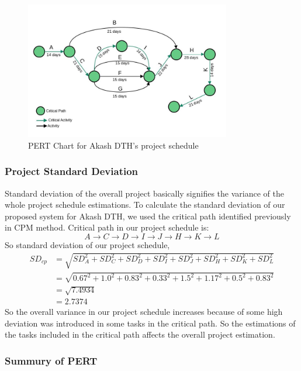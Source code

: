 \begin{spacing}{1}
\begin{figure}[H]
	\centering
	\includegraphics[width=0.8\textwidth]{PERT}
	\caption{PERT Chart for Akash DTH's project schedule}
	\label{fig:pert}
\end{figure} 
 
\subsubsection{Project Standard Deviation}
Standard deviation of the overall project basically signifies the variance of the whole project schedule estimations. To calculate the standard deviation of our proposed system for Akash DTH, we used the critical path identified previously in CPM method. Critical path in our project schedule is: 
\[ A \to C \to D \to I \to J \to H \to K \to L \]
So standard deviation of our project schedule,
\begin{equation*} 
	\begin{split}
		SD_{cp} &= \sqrt{SD_A^2 + SD_C^2 + SD_D^2 + SD_I^2 + SD_J^2  + SD_H^2 + SD_K^2 + SD_L^2 } \\
		&= \sqrt{0.67^2 + 1.0^2 + 0.83^2 + 0.33^2 + 1.5^2 + 1.17^2 + 0.5^2 + 0.83^2 } \\
		& = \sqrt{7.4934} \\
		& = 2.7374
	\end{split}
\end{equation*} 
So the overall variance in our project schedule increases because of some high deviation was introduced in some tasks in the critical path. So the estimations of the tasks included in the critical path affects the overall project estimation.

\subsubsection{Summury of PERT}
  
\end{spacing}